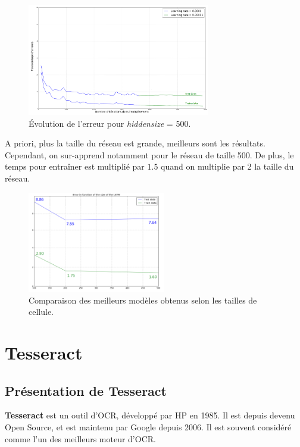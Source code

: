\documentclass{report}
\begin{document}
\begin{figure}[!h] 
	\center
	\includegraphics[width=8cm]{img/curve_500.png}
	\caption{Évolution de l'erreur pour \textit{hiddensize} = 500.}
	\label{err_size}
\end{figure}

A priori, plus la taille du réseau est grande, meilleurs sont les résultats. Cependant, on sur-apprend notamment pour le réseau de taille 500. De plus, le temps pour entraîner est multiplié par $1.5$ quand on multiplie par 2 la taille du réseau.

\begin{figure}[!h] 
	\center
	\includegraphics[width=6cm]{img/curves.png}
	\caption{Comparaison des meilleurs modèles obtenus selon les tailles de cellule.}
	\label{err_size}
\end{figure}


\FloatBarrier
\newpage
\newpage

\section{Tesseract}

\subsection{Présentation de Tesseract}

\textbf{Tesseract} est un outil d'OCR, développé par HP en 1985.
Il est depuis devenu Open Source, et est maintenu par Google depuis 2006.
Il est souvent considéré comme l'un des meilleurs moteur d'OCR.
\end{document}
